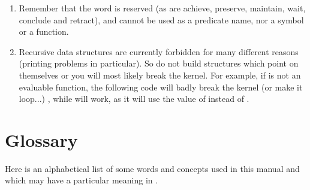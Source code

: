 \begin{enumerate}

\item Remember that the word  is reserved (as are achieve, preserve,
maintain, wait, conclude and retract), and cannot be used as a predicate name,
nor a symbol or a function.

\item Recursive data structures are currently forbidden for many
different reasons (printing problems in particular). So do not build structures
which point on themselves or you will most likely break the kernel. For
example, if  is not an evaluable function, the following code will
badly break the kernel (or make it loop...) , while
 will work, as it will use the value of
 instead of .

\end{enumerate}

\chapter{Glossary}

Here is an alphabetical list of some words and concepts used in this
manual and which may have a particular meaning in \COPRS{}.

